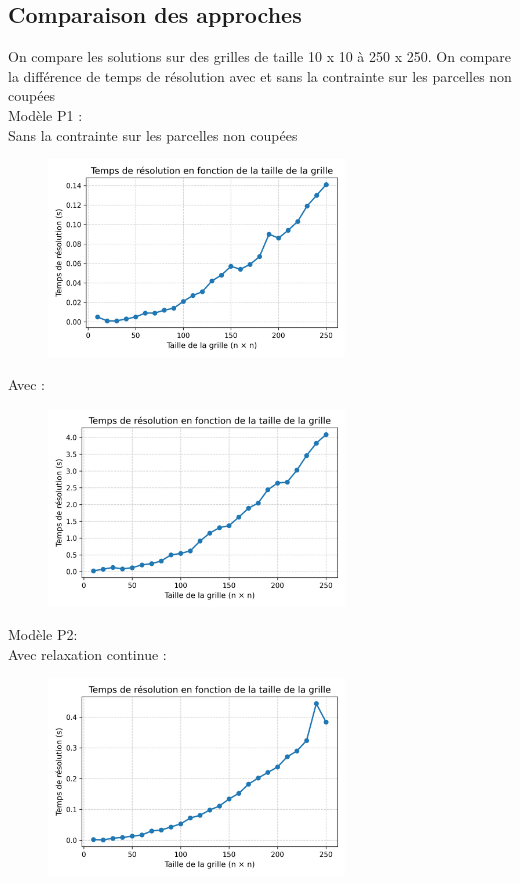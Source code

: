 \documentclass[a4paper,11pt]{article}
\begin{document}
\subsection{Comparaison des approches}
On compare les solutions sur des grilles de taille 10 x 10 à 250 x 250. On compare 
la différence de temps de résolution avec et sans la contrainte sur les parcelles non coupées \\
Modèle P1 : \\
Sans la contrainte sur les parcelles non coupées
\begin{figure}[H]
  \centering
  \includegraphics[width=0.7\textwidth]{figs/execution_time_P1_sans_B.png}
\end{figure}
Avec :
\begin{figure}[H]
  \centering
  \includegraphics[width=0.7\textwidth]{figs/execution_time_P1_avec_B.png}
\end{figure}
Modèle P2:\\
Avec relaxation continue :
\begin{figure}[H]
  \centering
  \includegraphics[width=0.7\textwidth]{figs/execution_time_P2_relaxed.png}
\end{figure}
\end{document}
